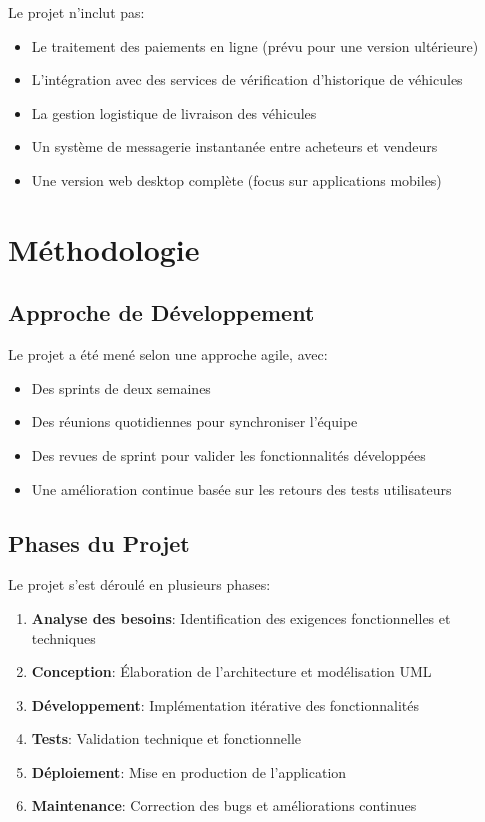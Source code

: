 Le projet n'inclut pas:

\begin{itemize}
    \item Le traitement des paiements en ligne (prévu pour une version ultérieure)
    \item L'intégration avec des services de vérification d'historique de véhicules
    \item La gestion logistique de livraison des véhicules
    \item Un système de messagerie instantanée entre acheteurs et vendeurs
    \item Une version web desktop complète (focus sur applications mobiles)
\end{itemize}

\section{Méthodologie}

\subsection{Approche de Développement}

Le projet a été mené selon une approche agile, avec:

\begin{itemize}
    \item Des sprints de deux semaines
    \item Des réunions quotidiennes pour synchroniser l'équipe
    \item Des revues de sprint pour valider les fonctionnalités développées
    \item Une amélioration continue basée sur les retours des tests utilisateurs
\end{itemize}

\subsection{Phases du Projet}

Le projet s'est déroulé en plusieurs phases:

\begin{enumerate}
    \item \textbf{Analyse des besoins}: Identification des exigences fonctionnelles et techniques
    \item \textbf{Conception}: Élaboration de l'architecture et modélisation UML
    \item \textbf{Développement}: Implémentation itérative des fonctionnalités
    \item \textbf{Tests}: Validation technique et fonctionnelle
    \item \textbf{Déploiement}: Mise en production de l'application
    \item \textbf{Maintenance}: Correction des bugs et améliorations continues
\end{enumerate}


